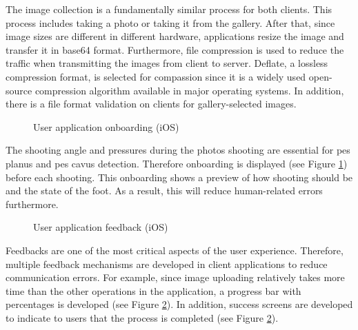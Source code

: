 The image collection is a fundamentally similar process for both clients. This process includes taking a photo or taking it from the gallery. After that, since image sizes are different in different hardware, applications resize the image and transfer it in base64 format. Furthermore, file compression is used to reduce the traffic when transmitting the images from client to server. Deflate, a lossless compression format, is selected for compassion since it is a widely used open-source compression algorithm available in major operating systems. In addition, there is a file format validation on clients for gallery-selected images. 

\begin{figure}[htbp]
\centering
{}
\caption{User application onboarding (iOS)}
\label{fig:UserApplicationOnboarding}
\end{figure}

The shooting angle and pressures during the photos shooting are essential for pes planus and pes cavus detection. Therefore onboarding is displayed (see Figure \ref{fig:UserApplicationOnboarding}) before each shooting. This onboarding shows a preview of how shooting should be and the state of the foot. As a result, this will reduce human-related errors furthermore. 

\begin{figure}[htbp]
\centering
{}
\caption{User application feedback (iOS)}
\label{fig:UserApplicationFeedback}
\end{figure}

Feedbacks are one of the most critical aspects of the user experience.  Therefore, multiple feedback mechanisms are developed in client applications to reduce communication errors. For example, since image uploading relatively takes more time than the other operations in the application, a progress bar with percentages is developed (see Figure \ref{fig:UserApplicationFeedback}). In addition, success screens are developed to indicate to users that the process is completed (see Figure \ref{fig:UserApplicationFeedback}).  

